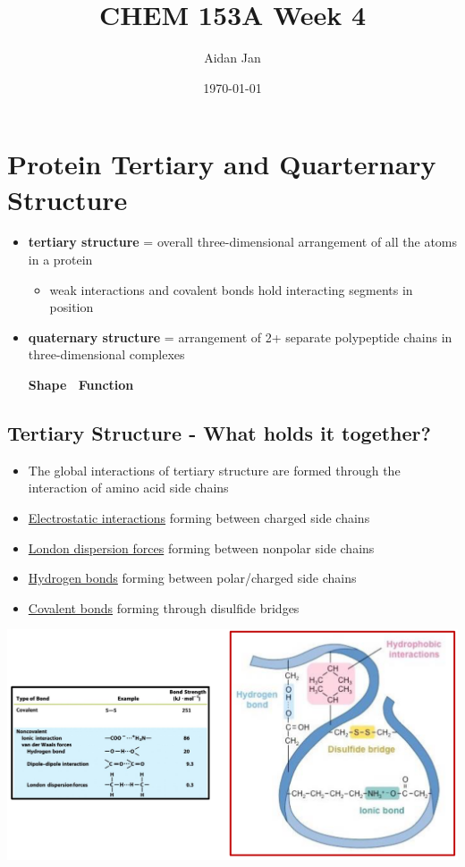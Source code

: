 \documentclass[10pt]{article}
\title{CHEM 153A Week 4}
\author{Aidan Jan}
\date{\today}
\begin{document}
\maketitle

\section*{Protein Tertiary and Quarternary Structure}
\begin{itemize}
    \item \textbf{tertiary structure} = overall three-dimensional arrangement of all the atoms in a protein
    \begin{itemize}
        \item weak interactions and covalent bonds hold interacting segments in position
    \end{itemize}
    \item \textbf{quaternary structure} = arrangement of 2+ separate polypeptide chains in three-dimensional complexes
    \begin{center}
        \textbf{Shape \textrightarrow~Function}
    \end{center}
\end{itemize}

\subsection*{Tertiary Structure - What holds it together?}
\begin{itemize}
    \item The global interactions of tertiary structure are formed through the interaction of amino acid side chains
    \item \underline{Electrostatic interactions} forming between charged side chains
    \item \underline{London dispersion forces} forming between nonpolar side chains
    \item \underline{Hydrogen bonds} forming between polar/charged side chains
    \item \underline{Covalent bonds} forming through disulfide bridges
\end{itemize}
\begin{center}
    \includegraphics*[width=\textwidth]{L1_1.png}
\end{center}
\end{document}
